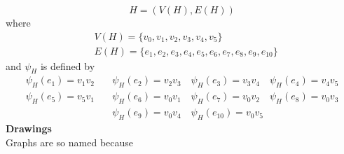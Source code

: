 \documentclass{report}
\theoremstyle{definition}
\begin{document}
\begin{equation*}
H=(V(H),E(H))
\end{equation*}
where
\begin{align*}
&V(H)=\{v_0,v_1,v_2,v_3,v_4,v_5\}\\
&E(H)=\{e_1,e_2,e_3,e_4,e_5,e_6,e_7,e_8,e_9,e_{10}\}
\end{align*}
and $\psi_H$ is defined by
\begin{align*}
\psi_H(e_1)=v_1v_2\quad&\psi_H(e_2)=v_2v_3\quad\psi_H(e_3)=v_3v_4\quad\psi_H(e_4)=v_4v_5\\
\psi_H(e_5)=v_5v_1\quad&\psi_H(e_6)=v_0v_1\quad\psi_H(e_7)=v_0v_2\quad\psi_H(e_8)=v_0v_3\\
&\psi_H(e_9)=v_0v_4\quad\psi_H(e_{10})=v_0v_5
\end{align*}
\textbf{Drawings}\\
Graphs are so named because
\end{document}
